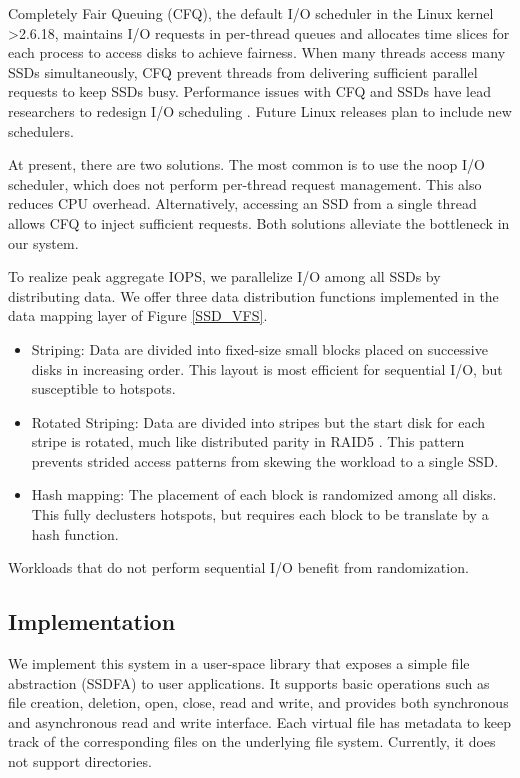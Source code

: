 Completely Fair Queuing (CFQ), the default I/O scheduler in the Linux kernel >2.6.18,
maintains I/O requests in per-thread queues and allocates time slices for each process
to access disks to achieve fairness. 
When many threads access many SSDs simultaneously, CFQ prevent threads 
from delivering sufficient parallel requests to keep SSDs busy.
Performance issues with CFQ and SSDs have lead researchers to redesign 
I/O scheduling \cite{Park12}. Future Linux releases plan to include new schedulers.

At present, there are two solutions.  The most common is to use the 
noop I/O scheduler, which does not perform per-thread
request management.  This also reduces CPU overhead.  Alternatively, accessing
an SSD from a single thread allows CFQ to inject sufficient requests.
Both solutions alleviate the bottleneck in our system.  

\label{data_layout}
To realize peak aggregate IOPS, we parallelize I/O among all SSDs by 
distributing data.  We offer three data distribution functions implemented in 
the data mapping layer of Figure \ref{SSD_VFS}.

\vspace{-10pt}
\begin{itemize}
\addtolength{\itemsep}{-5pt}
	\item Striping: Data are divided into fixed-size small blocks placed on 
    successive disks in increasing order.  This layout is most efficient
    for sequential I/O, but susceptible to hotspots.
	\item Rotated Striping: Data are divided into stripes but the start disk for
    each stripe is rotated, much like distributed parity in RAID5 \cite{raid}.
    This pattern prevents strided access patterns from skewing the workload
    to a single SSD.
	\item Hash mapping: The placement of each block is randomized
    among all disks.  This fully declusters hotspots, but requires each
    block to be translate by a hash function.
\end{itemize}
\vspace{-10pt}

\noindent Workloads that do not perform sequential I/O benefit from randomization.

\subsection{Implementation}
We implement this system in a user-space library that exposes a simple
file abstraction (SSDFA) to user applications. It supports basic operations
such as file creation, deletion, open, close, read and write,
and provides both synchronous and asynchronous read and write interface.
Each virtual file has metadata to keep track of the corresponding files on the
underlying file system. Currently, it does not support directories.

